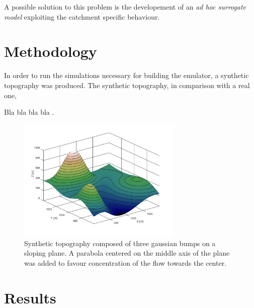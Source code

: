A possible solution to this problem is the developement of an \emph{ad hoc surrogate model} exploiting the catchment specific behaviour.


\section{Methodology}

In order to run the simulations necessary for building the emulator, a synthetic topography was produced.
The synthetic topography, in comparison with a real one, 

Bla bla bla bla \autocite{octave_community_gnu_2018}.

\begin{figure}[htpb]
  \centering
  \includegraphics[width=0.7\textwidth]{../../../img/topography.png}
  \caption{Synthetic topography composed of three gaussian bumps on a sloping plane. A parabola centered on the middle axis of the plane was added to favour concentration of the flow towards the center.}
  \label{fig:topography}
\end{figure}

\section{Results}

